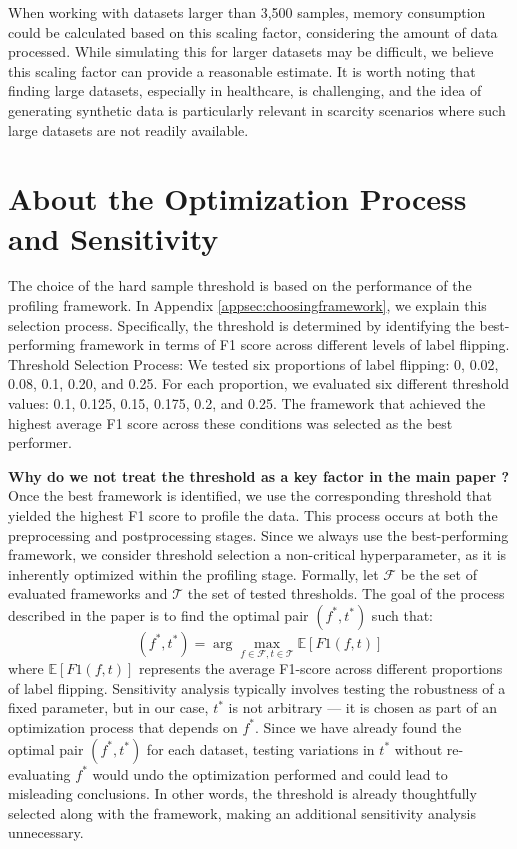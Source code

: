 \documentclass{article}
\theoremstyle{plain}
\theoremstyle{definition}
\theoremstyle{remark}
\begin{document}
When working with datasets larger than 3,500 samples, memory consumption could be calculated based on this scaling factor, considering the amount of data processed. While simulating this for larger datasets may be difficult, we believe this scaling factor can provide a reasonable estimate. It is worth noting that finding large datasets, especially in healthcare, is challenging, and the idea of generating synthetic data is particularly relevant in scarcity scenarios where such large datasets are not readily available.

\section{ About the Optimization Process and Sensitivity} \label{appsec:threshold}



The choice of the hard sample threshold is based on the performance of the profiling framework. In Appendix \ref{appsec:choosingframework}, we explain this selection process. Specifically, the threshold is determined by identifying the best-performing framework in terms of F1 score across different levels of label flipping.
Threshold Selection Process: We tested six proportions of label flipping: 0, 0.02, 0.08, 0.1, 0.20, and 0.25. For each proportion, we evaluated six different threshold values: 0.1, 0.125, 0.15, 0.175, 0.2, and 0.25. The framework that achieved the highest average F1 score across these conditions was selected as the best performer.

\textbf{Why do we not treat the threshold as a key factor in the main paper ?} Once the best framework is identified, we use the corresponding threshold that yielded the highest F1 score to profile the data. This process occurs at both the preprocessing and postprocessing stages. Since we always use the best-performing framework, we consider threshold selection a non-critical hyperparameter, as it is inherently optimized within the profiling stage.
Formally, let $ \mathcal{F} $ be the set of evaluated frameworks and $ \mathcal{T} $ the set of tested thresholds. The goal of the process described in the paper is to find the optimal pair $ (f^*, t^*) $ such that:
\begin{equation}
(f^*, t^*) = \arg\max_{f \in \mathcal{F}, t \in \mathcal{T}} \mathbb{E}[F1(f, t)]
\end{equation}
where $ \mathbb{E}[F1(f, t)] $ represents the average F1-score across different proportions of label flipping.
Sensitivity analysis typically involves testing the robustness of a fixed parameter, but in our case, $ t^* $ is not arbitrary — it is chosen as part of an optimization process that depends on $ f^* $. Since we have already found the optimal pair $ (f^*, t^*) $ for each dataset, testing variations in $ t^* $ without re-evaluating $ f^* $ would undo the optimization performed and could lead to misleading conclusions. In other words, the threshold is already thoughtfully selected along with the framework, making an additional sensitivity analysis unnecessary.
\end{document}
